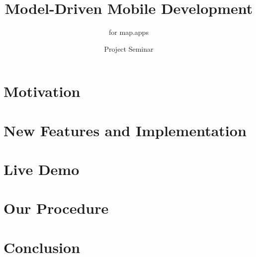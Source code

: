 \documentclass{beamer}
\author{Project Seminar \MD}
\title{Model-Driven Mobile Development}
\subtitle{\MD for map.apps}
\begin{document}
	\begin{frame}[plain]
	  \maketitle
	\end{frame}
    
    \section{Motivation}
    
    
    \section[Features]{New Features and Implementation}
    
    
    \section{Live Demo}
    
    
    \section[Procedure]{Our Procedure}
    
    
    \section{Conclusion}
    
\end{document}
